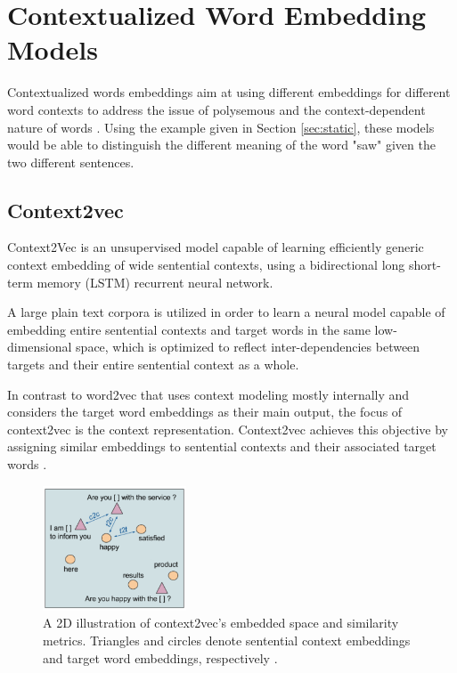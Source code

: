         

    
    \section{Contextualized Word Embedding Models}
    \label{sec:context}    
        \par Contextualized words embeddings aim at using different embeddings for different word contexts to address the issue of polysemous and the context-dependent nature of words \cite{Batista2018}. Using the example given in  Section \ref{sec:static}, these models would be able to distinguish the different meaning of the word "saw" given the two different sentences.

        \subsection{Context2vec}
        
            \par Context2Vec is an unsupervised model capable of learning efficiently generic context embedding of wide sentential contexts, using a bidirectional 
            long short-term memory (LSTM) recurrent neural network. 

            A large plain text corpora is utilized in order to learn a neural model capable of embedding  entire  sentential  contexts  and  target words in the same low-dimensional space, which is optimized to reflect inter-dependencies between targets and their entire sentential context as a whole. 
            
            
            In contrast to word2vec that uses context modeling mostly internally and considers the target word embeddings as their main output, the focus of context2vec is the context representation. Context2vec achieves this objective by assigning similar embeddings to sentential contexts and their associated target words \cite{Melamud2016}.

            \begin{figure}[H]
                \centering
                \captionsetup{justification=centering}
                \includegraphics[width=0.38\textwidth]{Sections/3StateOfTheArt/3_images/context2vec_embedding.png}
                \caption[Context2vec’s embedded space and similarity metrics.]{A 2D illustration of context2vec’s embedded space and similarity metrics. Triangles and circles denote sentential context embeddings and target word embeddings, respectively \cite{Melamud2016}.} 
            \end{figure}

